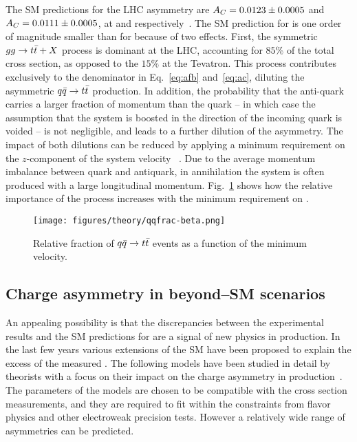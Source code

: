 The SM predictions for the LHC asymmetry are \mbox{$A_C{}=0.0123\pm{}0.0005$}
and \mbox{$A_C{}=0.0111\pm0.0005$}, at \seventev{} and \eighttev{}
respectively~\cite{Bernreuther:2012sx}.  
The SM prediction for \ac{} is one order of magnitude smaller than for
\afb{} because of two effects. First, the symmetric $gg\to t\bar{t}{}+X$
process is dominant at the LHC, accounting for $85\%$ of the total
cross section, as opposed to the $15\%$ at the Tevatron. This process
contributes exclusively to the denominator in Eq.~\ref{eq:afb}
and~\ref{eq:ac}, diluting the asymmetric \mbox{$q\bar{q}{}\to t\bar{t}{}$}
production. In addition, the probability that the anti-quark carries a
larger fraction of momentum than the quark -- in which case the
assumption that the \ttbar{} system is boosted in the direction of the
incoming quark is voided -- is not negligible, and leads to a further
dilution of the asymmetry. The impact of both dilutions can be reduced
by applying a minimum requirement on the $z$-component of the \ttbar{}
system velocity \betatt{}~\cite{AguilarSaavedra:2011cp}. Due to the
average momentum imbalance between quark and antiquark, in \qqbar{}
annihilation the \ttbar{} system is often produced with a large longitudinal
momentum. Fig.~\ref{fig:qqbarfrac} shows how the relative importance
of the \qqbar{} process increases with the minimum requirement on \betatt{}.

\begin{figure}[!htb]
  \centering
  \texttt{[image: figures/theory/qqfrac-beta.png]} 
  \caption{Relative fraction of $q\bar{q}{}\to t\bar{t}{}$ events as a function of the
    minimum \ttbar{} velocity.} 
  \label{fig:qqbarfrac}
\end{figure}

\subsection{Charge asymmetry in beyond--SM scenarios}
\label{sec:bsmca}

An appealing possibility is that the discrepancies between the
experimental results and the SM predictions for \afb{} are a signal of
new physics in \ttbar{} production. In the last few years various
extensions of the SM have been proposed to explain the excess of the
measured \afb{}. The following models have been studied in
detail by theorists with a focus on their impact on the charge
asymmetry in \ttbar{} production~\cite{Aguilar-Saavedra:2014kpa}. The
parameters of the models are chosen to be compatible with the \ttbar{}
cross section measurements, and they are required to fit within the
constraints from flavor physics and other electroweak precision
tests. However a relatively wide range of asymmetries can be predicted.

